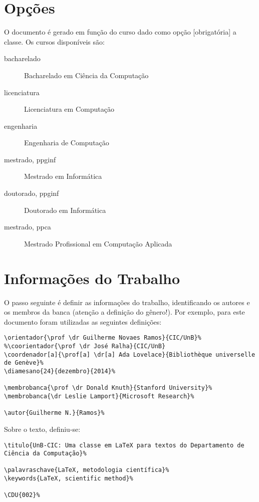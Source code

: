 \section{Opções}
O documento é gerado em função do curso dado como opção [obrigatória] a classe.
Os cursos disponíveis são:
\begin{description}
  \item[bacharelado] Bacharelado em Ciência da Computação
  \item[licenciatura] Licenciatura em Computação
  \item[engenharia] Engenharia de Computação
  \item[mestrado, ppginf] Mestrado em Informática
  \item[doutorado, ppginf] Doutorado em Informática
  \item[mestrado, ppca] Mestrado Profissional em Computação Aplicada
\end{description}



\section{Informações do Trabalho}%
O passo seguinte é definir as informações do trabalho, identificando os autores
e os membros da banca (atenção a definição do gênero!). Por exemplo, para este
documento foram utilizadas as seguintes definições:

\begin{verbatim}
\orientador{\prof \dr Guilherme Novaes Ramos}{CIC/UnB}%
%\coorientador{\prof \dr José Ralha}{CIC/UnB}
\coordenador[a]{\prof[a] \dr[a] Ada Lovelace}{Bibliothèque universelle de Genève}%
\diamesano{24}{dezembro}{2014}%

\membrobanca{\prof \dr Donald Knuth}{Stanford University}%
\membrobanca{\dr Leslie Lamport}{Microsoft Research}%

\autor{Guilherme N.}{Ramos}%
\end{verbatim}

Sobre o texto, definiu-se:
\begin{verbatim}
\titulo{UnB-CIC: Uma classe em LaTeX para textos do Departamento de
Ciência da Computação}%

\palavraschave{LaTeX, metodologia científica}%
\keywords{LaTeX, scientific method}%

\CDU{002}%
\end{verbatim}

